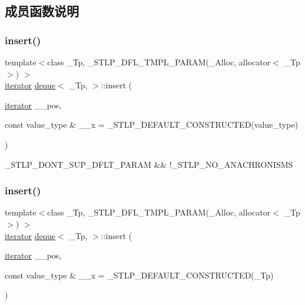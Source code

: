 \subsection{成员函数说明}
\mbox{\label{classdeque_a74f0345cf9468b0700654de0845dfb00}} 
\subsubsection{\texorpdfstring{insert()}{insert()}\hspace{0.1cm}{\footnotesize\ttfamily [1/2]}}
{\footnotesize\ttfamily template$<$class \+\_\+\+Tp, \+\_\+\+S\+T\+L\+P\+\_\+\+D\+F\+L\+\_\+\+T\+M\+P\+L\+\_\+\+P\+A\+R\+A\+M(\+\_\+\+Alloc, allocator$<$ \+\_\+\+Tp $>$) $>$ \\
\hyperlink{structiterator}{iterator} \hyperlink{classdeque}{deque}$<$ \+\_\+\+Tp, $>$\+::insert (\begin{DoxyParamCaption}\item[{\hyperlink{structiterator}{iterator}}]{\+\_\+\+\_\+pos,  }\item[{const value\+\_\+type \&}]{\+\_\+\+\_\+x = {\ttfamily \+\_\+STLP\+\_\+DEFAULT\+\_\+CONSTRUCTED(value\+\_\+type)} }\end{DoxyParamCaption})\hspace{0.3cm}{\ttfamily [inline]}}

\+\_\+\+S\+T\+L\+P\+\_\+\+D\+O\+N\+T\+\_\+\+S\+U\+P\+\_\+\+D\+F\+L\+T\+\_\+\+P\+A\+R\+AM \&\& !\+\_\+\+S\+T\+L\+P\+\_\+\+N\+O\+\_\+\+A\+N\+A\+C\+H\+R\+O\+N\+I\+S\+MS \mbox{\label{classdeque_a11db751b5a2c95c19f852703b6724591}} 
\subsubsection{\texorpdfstring{insert()}{insert()}\hspace{0.1cm}{\footnotesize\ttfamily [2/2]}}
{\footnotesize\ttfamily template$<$class \+\_\+\+Tp, \+\_\+\+S\+T\+L\+P\+\_\+\+D\+F\+L\+\_\+\+T\+M\+P\+L\+\_\+\+P\+A\+R\+A\+M(\+\_\+\+Alloc, allocator$<$ \+\_\+\+Tp $>$) $>$ \\
\hyperlink{structiterator}{iterator} \hyperlink{classdeque}{deque}$<$ \+\_\+\+Tp, $>$\+::insert (\begin{DoxyParamCaption}\item[{\hyperlink{structiterator}{iterator}}]{\+\_\+\+\_\+pos,  }\item[{const value\+\_\+type \&}]{\+\_\+\+\_\+x = {\ttfamily \+\_\+STLP\+\_\+DEFAULT\+\_\+CONSTRUCTED(\+\_\+Tp)} }\end{DoxyParamCaption})\hspace{0.3cm}{\ttfamily [inline]}}

